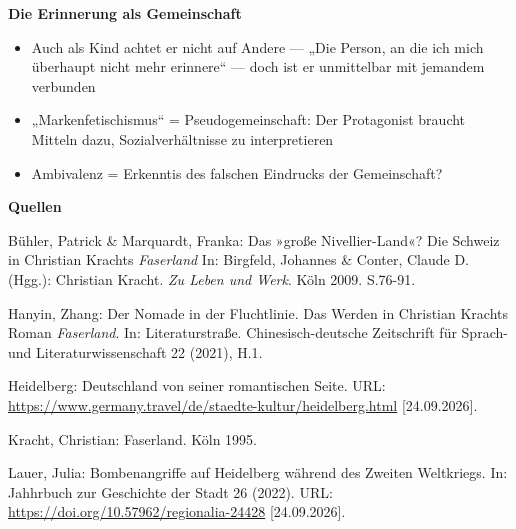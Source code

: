 \documentclass[12pt,a4paper]{article}
\begin{document}
%
\vspace{.5em}
\textbf{\large Die Erinnerung als Gemeinschaft}
\begin{itemize}
    \item Auch als Kind achtet er nicht auf Andere — „Die Person, an die ich mich überhaupt nicht mehr erinnere“ — doch ist er unmittelbar mit jemandem verbunden
    \item „Markenfetischismus“ = Pseudogemeinschaft: Der Protagonist braucht Mitteln dazu, Sozialverhältnisse zu interpretieren
    \item Ambivalenz = Erkenntis des falschen Eindrucks der Gemeinschaft?
\end{itemize}
%
\clearpage
\medskip\noindent\textbf{\Large Quellen}\\
\onehalfspacing
\setlength{\parindent}{0pt}
{Bühler, Patrick \& Marquardt, Franka: Das »große Nivellier-Land«? Die Schweiz in Christian Krachts \textit{Faserland} In: Birgfeld, Johannes \& Conter, Claude D. (Hgg.): Christian Kracht. \textit{Zu Leben und Werk}. Köln 2009. S.76-91.
\vspace{0.75em}

Hanyin, Zhang: Der Nomade in der Fluchtlinie. Das Werden in Christian Krachts Roman \textit{Faserland}. In: Literaturstraße. Chinesisch-deutsche Zeitschrift für Sprach-und Literaturwissenschaft 22 (2021), H.1.
\vspace{0.75em}

Heidelberg: Deutschland von seiner romantischen Seite. URL:\\ {\url{https://www.germany.travel/de/staedte-kultur/heidelberg.html} [24.09.2026].}
\vspace{0.75em}

Kracht, Christian: Faserland. Köln 1995.
\vspace{0.75em}

Lauer, Julia: Bombenangriffe auf Heidelberg während des Zweiten Weltkriegs. In: Jahhrbuch zur Geschichte der Stadt 26 (2022). URL: \\{\url{https://doi.org/10.57962/regionalia-24428}} [24.09.2026].}

 
\end{document}
